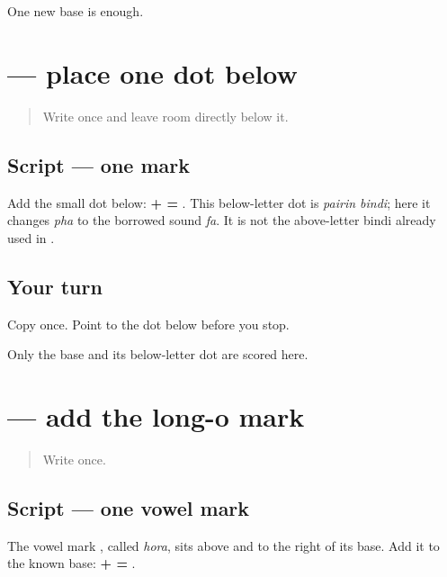 \begin{tcolorbox}[breakable,colback=teal!4,colframe=teal!35!black,title={Before you move on}]
One new base is enough.
\end{tcolorbox}
\section[\texorpdfstring{\pa{ਫ਼} (fa)}{ਫ਼ (fa)}]{ — place one dot below}

\label{lesson:PA-W08-pairin-bindi}



\begin{quote}
Write \textbf{} once and leave room directly below it.
\end{quote}

\subsection*{Script — one mark}
Add the small dot below: \textbf{ +  = }. This below-letter dot is \emph{pairin bindi}; here it changes \emph{pha} to the borrowed sound \emph{fa}. It is not the above-letter bindi already used in \textbf{}.

\subsection*{Your turn}
Copy \textbf{} once. Point to the dot below before you stop.

\begin{tcolorbox}[breakable,colback=teal!4,colframe=teal!35!black,title={Before you move on}]
Only the base and its below-letter dot are scored here.
\end{tcolorbox}
\section[\texorpdfstring{\pa{ੋ} (hora)}{ੋ (hora)}]{ — add the long-o mark}

\label{lesson:PA-W08-hora}



\begin{quote}
Write \textbf{} once.
\end{quote}

\subsection*{Script — one vowel mark}
The vowel mark \textbf{}, called \emph{hora}, sits above and to the right of its base. Add it to the known base: \textbf{ +  = }.

